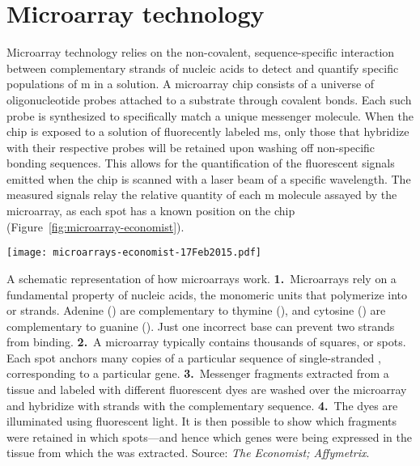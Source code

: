 \section{Microarray technology}
\label{sec:microarray-methods}

Microarray technology relies on the non-covalent, sequence-specific interaction
between complementary strands of nucleic acids\cite{watson_molecular_1953} to
detect and quantify specific populations of m in a solution.  A
microarray chip consists of a universe of oligonucleotide probes attached to a
substrate through covalent bonds.  Each such probe is synthesized to
specifically match a unique messenger  molecule.  When the chip
is exposed to a solution of fluorecently labeled ms, only those
that hybridize with their respective probes will be retained upon washing off
non-specific bonding sequences.  This allows for the quantification of the
fluorescent signals emitted when the chip is scanned with a laser beam of a
specific wavelength.  The measured signals relay the relative quantity of each
m molecule assayed by the microarray, as each spot has a known
position on the chip (Figure~\ref{fig:microarray-economist}).


\begin{marginfigure}%
  \begin{center}
    \texttt{[image: microarrays-economist-17Feb2015.pdf]}
    \caption[Schematic representation of how microarrays work]{A schematic
      representation of how microarrays work.  \textbf{1.}~Microarrays rely on a
      fundamental property of nucleic acids, the monomeric units that polymerize
      into  or  strands.  Adenine ()
      are complementary to thymine (), and cytosine ()
      are complementary to guanine ().  Just one incorrect base can
      prevent two strands from binding.  \textbf{2.}~A microarray typically
      contains thousands of squares, or spots.  Each spot anchors many copies of
      a particular sequence of single-stranded , corresponding to
      a particular gene.  \textbf{3.}~Messenger  fragments
      extracted from a tissue and labeled with different fluorescent dyes are
      washed over the microarray and hybridize with  strands with
      the complementary sequence.  \textbf{4.}~The dyes are illuminated using
      fluorescent light.  It is then possible to show which 
      fragments were retained in which spots---and hence which genes were being
      expressed in the tissue from which the  was extracted.
      Source: \emph{The Economist;
        Affymetrix}.}\label{fig:microarray-economist}%
  \end{center}
\end{marginfigure}

